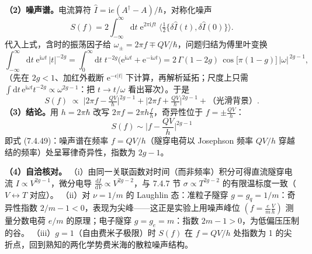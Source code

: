 \textbf{（2）噪声谱。}电流算符 $\hat{I}=\mathrm{i}e(A^{\dagger}-A)/\hbar$，对称化噪声
\begin{equation*}
S(f)=2\int_{-\infty}^{\infty}\mathrm{d}t\;\mathrm{e}^{2\pi\mathrm{i}ft}\;
\langle\tfrac12\{\delta\hat{I}(t),\delta\hat{I}(0)\}\rangle .
\end{equation*}
代入上式，含时的振荡因子给 $\omega_\pm=2\pi f\mp QV/\hbar$，问题归结为傅里叶变换
\begin{equation*}
\int_{-\infty}^{\infty}\mathrm{d}t\;\mathrm{e}^{\mathrm{i}\omega t}\,|t|^{-2g}
=\int_0^\infty\mathrm{d}t\;t^{-2g}\big(\mathrm{e}^{\mathrm{i}\omega t}+\mathrm{e}^{-\mathrm{i}\omega t}\big)
=2\,\Gamma(1-2g)\,\cos\!\big[\pi(1-g)\big]\,|\omega|^{\,2g-1},
\end{equation*}
（先在 $2g<1$、加红外截断 $\mathrm{e}^{-\epsilon|t|}$ 下计算，再解析延拓；尺度上只需 $\int\mathrm{d}t\,\mathrm{e}^{\mathrm{i}\omega t}t^{-2g}\propto\omega^{2g-1}$：把 $t\to t/\omega$ 看出幂次）。于是
\begin{equation*}
S(f)\;\propto\;\big|2\pi f-\tfrac{QV}{\hbar}\big|^{2g-1}
+\big|2\pi f+\tfrac{QV}{\hbar}\big|^{2g-1}
+\text{（光滑背景）}.
\end{equation*}
\textbf{（3）结论。}用 $h=2\pi\hbar$ 改写 $2\pi f=2\pi h\frac{f}{h}$，奇异性位于 $f=\pm\frac{QV}{h}$：
\begin{equation*}
\boxed{\;S(f)\sim\Big|f-\frac{QV}{h}\Big|^{2g-1}\;}
\end{equation*}
即式 (7.4.49)：噪声谱在频率 $f=QV/h$（隧穿电荷以 Josephson 频率 $QV/h$ 穿越结的频率）处呈幂律奇异性，指数为 $2g-1$。

\textbf{（4）自洽核对。}
（i）由同一关联函数对时间（而非频率）积分可得直流隧穿电流 $I\propto V^{2g-1}$，微分电导 $\frac{\mathrm{d}I}{\mathrm{d}V}\propto V^{2g-2}$，与 7.4.7 节 $\sigma\propto T^{2g-2}$ 的有限温标度一致（$V\leftrightarrow T$ 对应）。
（ii）对 $\nu=1/m$ 的 Laughlin 态：准粒子隧穿 $g=g_q=1/m$：奇异性指数 $2/m-1<0$，表现为尖峰——这正是实验上用噪声峰位 $\left(f=\frac{e}{m}\frac{V}{h}\right)$ 测量分数电荷 $e/m$ 的原理；电子隧穿 $g=g_e=m$：指数 $2m-1>0$，为低偏压压制的谷。
（iii）$g=1$（自由费米子极限）时 $S(f)$ 在 $f=QV/h$ 处指数为 1 的尖折点，回到熟知的两化学势费米海的散粒噪声结构。
